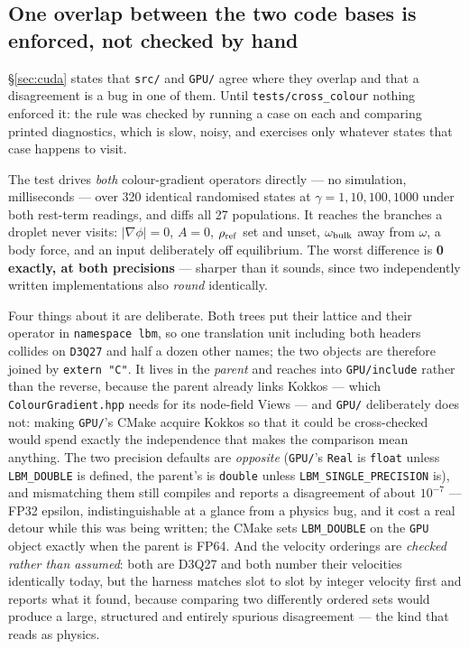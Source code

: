 \documentclass[11pt,a4paper]{article}
\newcommand{\code}[1]{\texttt{\small #1}}
\begin{document}
\subsection{One overlap between the two code bases is enforced, not checked by
hand}
\label{sec:crosscolour}

\S\ref{sec:cuda} states that \code{src/} and \code{GPU/} agree where they
overlap and that a disagreement is a bug in one of them. Until
\code{tests/cross\_colour} nothing enforced it: the rule was checked by running
a case on each and comparing printed diagnostics, which is slow, noisy, and
exercises only whatever states that case happens to visit.

The test drives \emph{both} colour-gradient operators directly --- no simulation,
milliseconds --- over 320 identical randomised states at
$\gamma=1,10,100,1000$ under both rest-term readings, and diffs all 27
populations. It reaches the branches a droplet never visits:
$|\nabla\phi|=0$, $A=0$, $\rho_{\rm ref}$ set and unset, $\omega_{\rm bulk}$
away from $\omega$, a body force, and an input deliberately off equilibrium. The
worst difference is \textbf{0 exactly, at both precisions} --- sharper than it
sounds, since two independently written implementations also \emph{round}
identically.

Four things about it are deliberate. Both trees put their lattice and their
operator in \code{namespace lbm}, so one translation unit including both headers
collides on \code{D3Q27} and half a dozen other names; the two objects are
therefore joined by \code{extern "C"}. It lives in the \emph{parent} and reaches
into \code{GPU/include} rather than the reverse, because the parent already links
Kokkos --- which \code{ColourGradient.hpp} needs for its node-field Views --- and
\code{GPU/} deliberately does not: making \code{GPU/}'s CMake acquire Kokkos so
that it could be cross-checked would spend exactly the independence that makes
the comparison mean anything. The two precision defaults are \emph{opposite}
(\code{GPU/}'s \code{Real} is \code{float} unless \code{LBM\_DOUBLE} is
defined, the parent's is \code{double} unless \code{LBM\_SINGLE\_PRECISION}
is), and mismatching them still compiles and reports a disagreement of about
$10^{-7}$ --- FP32 epsilon, indistinguishable at a glance from a physics bug, and
it cost a real detour while this was being written; the CMake sets
\code{LBM\_DOUBLE} on the \code{GPU} object exactly when the parent is FP64.
And the velocity orderings are \emph{checked rather than assumed}: both are
D3Q27 and both number their velocities identically today, but the harness matches
slot to slot by integer velocity first and reports what it found, because
comparing two differently ordered sets would produce a large, structured and
entirely spurious disagreement --- the kind that reads as physics.
\end{document}
